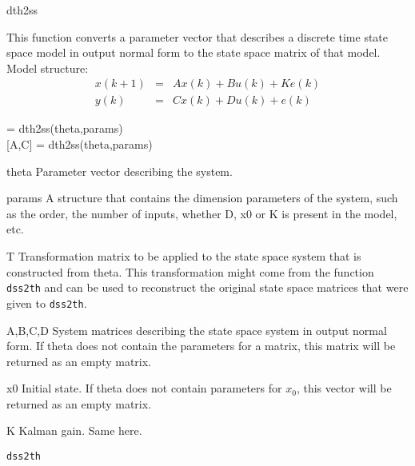 \documentclass{book}
\newcommand{\dsstoth}{\texttt{dss2th}}
\begin{document}
\begin{command}{dth2ss}
  \begin{purpose}
    This function converts a parameter vector that describes a
    discrete time state space model in output normal form to the state
    space matrix of that model.  Model structure:
    \begin{eqnarray*}
      x(k+1) & = &  A x(k) + B u(k)+Ke(k)\\
      y(k) & = & C x(k) + D u(k)+e(k)
    \end{eqnarray*}
  \end{purpose}
  \begin{syntax}  
    [A,B,C,D,x0,K] = dth2ss(theta,params)\\[0pt]
    [A,C] = dth2ss(theta,params)
  \end{syntax}
\begin{inputs}
\item[theta] Parameter vector describing the system.
\item[params] A structure that contains the dimension parameters of
  the system, such as the order, the number of inputs,
  whether D, x0 or K is present in the model, etc.
\item[T] Transformation matrix to be applied to the state space system
  that is constructed from theta. This transformation might come from
  the function {\dsstoth} and can be used to reconstruct the original state
  space matrices that were given to {\dsstoth}.
\end{inputs}
\begin{outputs}
\item[A,B,C,D] System matrices describing the state space system in
  output normal form. If theta does not contain the parameters for a
  matrix, this matrix will be returned as an empty matrix.
\item[x0] Initial state. If theta does not contain parameters for
  $x_0$, this vector will be returned as an empty matrix.
\item[K] Kalman gain. Same here.
\end{outputs}
\begin{seealso}
{\dsstoth} 
\end{seealso}
\end{command}%
\end{document}
